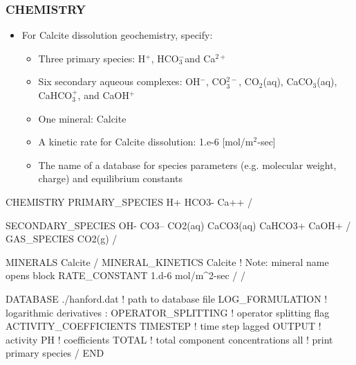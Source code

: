 \documentclass{beamer}
\def\calcium{Ca$^{2+}$}
\def\hion{H$^+$}
\def\hydroxide{OH$^-$}
\def\bicarbonate{HCO$_3^-$}
\def\carbonate{CO$_3^{2-}$}
\def\cotwo{CO$_2$(aq)}
\newcommand\bluecomment[1]{{{\color{blue} #1}}}
\begin{document}
\begin{frame}\frametitle{CHEMISTRY}

\begin{itemize}
\item For Calcite dissolution geochemistry, specify:
  \begin{itemize}
    \item Three primary species: \hion, \bicarbonate and \calcium
    \item Six secondary aqueous complexes: \hydroxide, \carbonate, \cotwo, CaCO$_3$(aq), CaHCO$_3^+$, and CaOH$^+$
    \item One mineral: Calcite
    \item A kinetic rate for Calcite dissolution: 1.e-6 [mol/m$^2$-sec]
    \item The name of a database for species parameters (e.g. molecular weight, charge) and equilibrium constants
  \end{itemize}
\end{itemize}

\begin{semiverbatim}
CHEMISTRY
  PRIMARY_SPECIES
    H+
    HCO3-
    Ca++
  /
\end{semiverbatim}
\newpage

\begin{semiverbatim}


  SECONDARY_SPECIES
    OH-
    CO3--
    CO2(aq)
    CaCO3(aq)
    CaHCO3+
    CaOH+
  /
  GAS_SPECIES
    CO2(g)
  /
\end{semiverbatim}
\newpage

\begin{semiverbatim}


  MINERALS
    Calcite
  /
  MINERAL_KINETICS
    Calcite       \bluecomment{! Note: mineral name opens block}
      RATE_CONSTANT 1.d-6 mol/m^2-sec
    /
  /
\end{semiverbatim}
\newpage

\begin{semiverbatim}


  DATABASE ./hanford.dat  \bluecomment{! path to database file}
  LOG_FORMULATION         \bluecomment{! logarithmic derivatives}
:  OPERATOR_SPLITTING     \bluecomment{! operator splitting flag}
  ACTIVITY_COEFFICIENTS TIMESTEP  \bluecomment{! time step lagged}
  OUTPUT                          \bluecomment{!   activity}
    PH                            \bluecomment{!   coefficients}
    TOTAL     \bluecomment{! total component concentrations}
    all       \bluecomment{! print primary species}
  /
END

\end{semiverbatim}

\end{frame}
\end{document}

